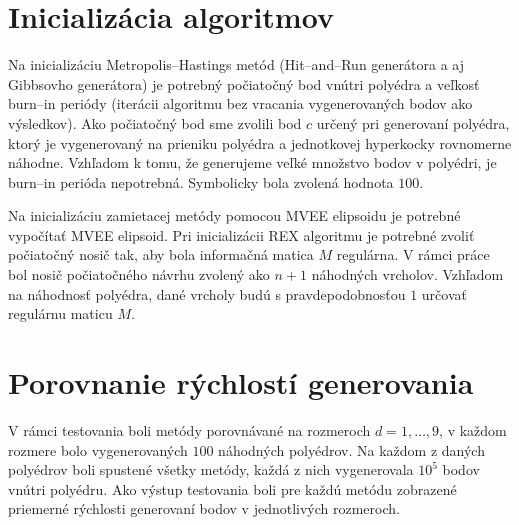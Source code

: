 \section{Inicializácia algoritmov}

Na inicializáciu Metropolis--Hastings metód (Hit--and--Run generátora a aj Gibbsovho generátora) je potrebný počiatočný bod vnútri polyédra a veľkosť burn--in periódy (iterácii algoritmu bez vracania vygenerovaných bodov ako výsledkov). Ako počiatočný bod sme zvolili bod $c$ určený pri generovaní polyédra, ktorý je vygenerovaný na prieniku polyédra a jednotkovej hyperkocky rovnomerne náhodne. Vzhľadom k tomu, že generujeme veľké množstvo bodov v polyédri, je burn--in perióda nepotrebná. Symbolicky bola zvolená hodnota $100$.

Na inicializáciu zamietacej metódy pomocou MVEE elipsoidu je potrebné vypočítať MVEE elipsoid. Pri inicializácii REX algoritmu je potrebné zvoliť počiatočný nosič tak, aby bola informačná matica $M$ regulárna. V rámci práce bol nosič počiatočného návrhu zvolený ako $n+1$ náhodných vrcholov. Vzhľadom na náhodnosť polyédra, dané vrcholy budú s pravdepodobnosťou $1$ určovať regulárnu maticu $M$.

\section{Porovnanie rýchlostí generovania}

V rámci testovania boli metódy porovnávané na rozmeroch $d=1, \dots, 9$, v každom rozmere bolo vygenerovaných $100$ náhodných polyédrov. Na každom z daných polyédrov boli spustené všetky metódy, každá z nich vygenerovala $10^5$ bodov vnútri polyédru. Ako výstup testovania boli pre každú metódu zobrazené priemerné rýchlosti generovaní bodov v jednotlivých rozmeroch.\\

